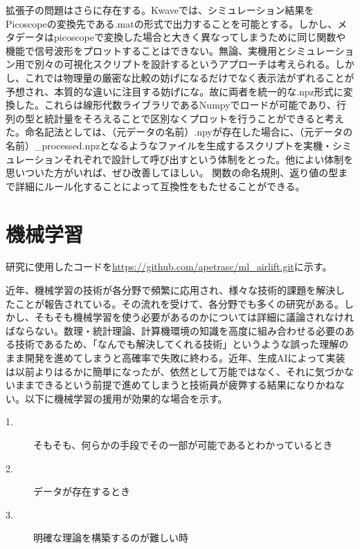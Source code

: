 \documentclass[uplatex]{suribt}
\begin{document}
拡張子の問題はさらに存在する。Kwaveでは、シミュレーション結果をPicoscopeの変換先である.matの形式で出力することを可能とする。しかし、メタデータはpicoscopeで変換した場合と大きく異なってしまうために同じ関数や機能で信号波形をプロットすることはできない。無論、実機用とシミュレーション用で別々の可視化スクリプトを設計するというアプローチは考えられる。しかし、これでは物理量の厳密な比較の妨げになるだけでなく表示法がずれることが予想され、本質的な違いに注目する妨げにな。故に両者を統一的な.npz形式に変換した。これらは線形代数ライブラリであるNumpyでロードが可能であり、行列の型と統計量をそろえることで区別なくプロットを行うことができると考えた。命名記法としては、（元データの名前）.npyが存在した場合に、（元データの名前）\_processed.npzとなるようなファイルを生成するスクリプトを実機・シミュレーションそれぞれで設計して呼び出すという体制をとった。他によい体制を思いついた方がいれば、ぜひ改善してほしい。
関数の命名規則、返り値の型まで詳細にルール化することによって互換性をもたせることができる。
\section{機械学習}
研究に使用したコードを\url{https://github.com/apetrasc/ml_airlift.git}に示す。\par
近年、機械学習の技術が各分野で頻繁に応用され、様々な技術的課題を解決したことが報告されている。その流れを受けて、各分野でも多くの研究がある。しかし、そもそも機械学習を使う必要があるのかについては詳細に議論されなければならない。数理・統計理論、計算機環境の知識を高度に組み合わせる必要のある技術であるため、「なんでも解決してくれる技術」というような誤った理解のまま開発を進めてしまうと高確率で失敗に終わる。近年、生成AIによって実装は以前よりはるかに簡単になったが、依然として万能ではなく、それに気づかないままできるという前提で進めてしまうと技術員が疲弊する結果になりかねない。以下に機械学習の援用が効果的な場合を示す。
\begin{description}
    \item[1.]そもそも、何らかの手段でその一部が可能であるとわかっているとき
    \item[2.]データが存在するとき
    \item[3.]明確な理論を構築するのが難しい時
\end{description}
\end{document}
